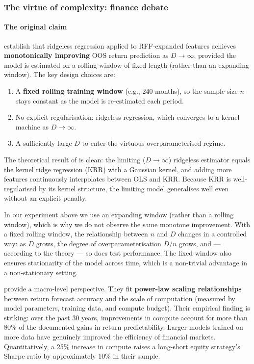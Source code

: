 \subsubsection{The virtue of complexity: finance debate}\label{sec_comp_virtue}

\paragraph{The original claim}

\cite{kelly2024virtue} establish that ridgeless regression applied to RFF-expanded features achieves \textbf{monotonically improving} OOS return prediction as $D \to \infty$, provided the model is estimated on a rolling window of fixed length (rather than an expanding window). The key design choices are:

\begin{enumerate}
\item A \textbf{fixed rolling training window} (e.g., 240 months), so the sample size $n$ stays constant as the model is re-estimated each period.
\item No explicit regularisation: ridgeless regression, which converges to a kernel machine as $D \to \infty$.
\item A sufficiently large $D$ to enter the virtuous overparameterised regime.
\end{enumerate}

The theoretical result of \cite{kelly2024virtue} is clean: the limiting ($D \to \infty$) ridgeless estimator equals the kernel ridge regression (KRR) with a Gaussian kernel, and adding more features continuously interpolates between OLS and KRR. Because KRR is well-regularised by its kernel structure, the limiting model generalises well even without an explicit penalty.

In our experiment above we use an expanding window (rather than a rolling window), which is why we do not observe the same monotone improvement. With a fixed rolling window, the relationship between $n$ and $D$ changes in a controlled way: as $D$ grows, the degree of overparameterisation $D/n$ grows, and --- according to the theory --- so does test performance. The fixed window also ensures stationarity of the model across time, which is a non-trivial advantage in a non-stationary setting.

\cite{timmermann2026compute} provide a macro-level perspective. They fit \textbf{power-law scaling relationships} between return forecast accuracy and the scale of computation (measured by model parameters, training data, and compute budget). Their empirical finding is striking: over the past 30 years, improvements in compute account for more than 80\% of the documented gains in return predictability. Larger models trained on more data have genuinely improved the efficiency of financial markets. Quantitatively, a 25\% increase in compute raises a long-short equity strategy's Sharpe ratio by approximately 10\% in their sample.

